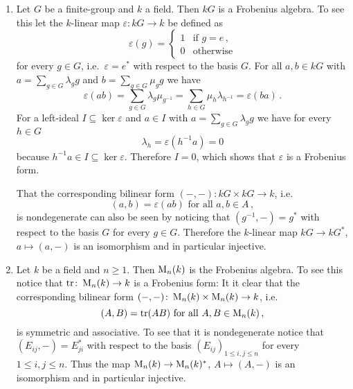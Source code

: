 \begin{example}
  \begin{enumerate}[label=\emph{\alph*)},leftmargin=*]
    \item
      Let $G$ be a finite-group and $k$ a field.
      Then $kG$ is a Frobenius algebra.
      To see this let the $k$-linear map $\varepsilon \colon kG \to k$ be defined as
      \[
          \varepsilon(g)
        = \begin{cases}
            1 & \text{if } g = e \,,  \\
            0 & \text{otherwise}
          \end{cases}
      \]
      for every $g \in G$, i.e.\ $\varepsilon = e^*$ with respect to the basis $G$.
      For all $a, b \in kG$ with $a = \sum_{g \in G} \lambda_g g$ and $b = \sum_{g \in G} \mu_g g$ we have
      \[
          \varepsilon(ab)
        = \sum_{g \in G} \lambda_g \mu_{g^{-1}}
        = \sum_{h \in G} \mu_h \lambda_{h^{-1}}
        = \varepsilon(ba) \,.
      \]
      For a left-ideal $I \subseteq \ker \varepsilon$ and $a \in I $ with $a = \sum_{g \in G} \lambda_g g$ we have for every $h \in G$
      \[
          \lambda_h
        = \varepsilon\left( h^{-1} a \right)
        = 0
      \]
      because $h^{-1} a \in I \subseteq \ker \varepsilon$.
      Therefore $I = 0$, which shows that $\varepsilon$ is a Frobenius form.
      
      That the corresponding bilinear form $(-,-) \colon kG \times kG \to k$, i.e.\
      \[
          (a,b)
        = \varepsilon(ab)
        \text{ for all }
        a, b \in A \,,
      \]
      is nondegenerate can also be seen by noticing that $(g^{-1},-) = g^*$ with respect to the basis $G$ for every $g \in G$.
      Therefore the $k$-linear map $kG \to kG^*$, $a \mapsto (a,-)$ is an isomorphism and in particular injective.
    \item
      Let $k$ be a field and $n \geq 1$.
      Then $\operatorname{M}_n(k)$ is the Frobenius algebra.
      To see this notice that $\operatorname{tr} \colon \operatorname{M}_n(k) \to k$ is a Frobenius form:
      It it clear that the corresponding bilinear form $(-,-) \colon \operatorname{M}_n(k) \times \operatorname{M}_n(k) \to k$, i.e.\
      \[
          (A,B)
        = \operatorname{tr}(AB)
        \text{ for all }
        A, B \in \operatorname{M}_n(k) \,,
      \]
      is symmetric and associative.
      To see that it is nondegenerate notice that $(E_{ij}, -) = E_{ji}^*$ with respect to the basis $(E_{ij})_{1 \leq i,j \leq n}$ for every $1 \leq i,j \leq n$.
      Thus the map $\operatorname{M}_n(k) \to \operatorname{M}_n(k)^*$, $A \mapsto (A,-)$ is an isomorphism and in particular injective.
  \end{enumerate}
\end{example}


